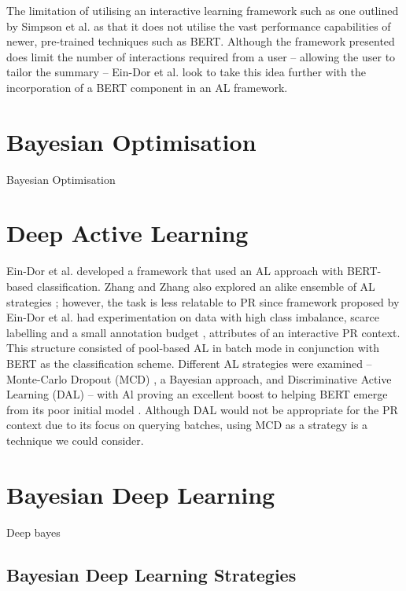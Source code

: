\documentclass[ %
                    author={James Stephenson},
                supervisor={Dr. Edwin Simpson},
                    degree={MSc},
                     title={Project Plan: Bayesian Deep Learning For Extractive Test Summarisation},
                  subtitle={},
                      type={},
                      year={2022}]{../additions/dissertation}
\begin{document}
The limitation of utilising an interactive learning framework such as one outlined by Simpson et al. \cite{Simpson19} as that it does not utilise the vast performance capabilities of newer, pre-trained techniques such as BERT. Although the framework presented does limit the number of interactions required from a user – allowing the user to tailor the summary – Ein-Dor et al. \cite{EinDor20} look to take this idea further with the incorporation of a BERT component in an AL framework. 

		\section{Bayesian Optimisation}
		\label{chap:literaturereview:bo}
		
		Bayesian Optimisation

		
		\section{Deep Active Learning}
		\label{chap:literaturereview:deepactive}
		
		Ein-Dor et al. \cite{EinDor20} developed a framework that used an AL approach with BERT-based classification. Zhang and Zhang also explored an alike ensemble of AL strategies \cite{Zhang19}; however, the task is less relatable to PR since framework proposed by Ein-Dor et al. had experimentation on data with high class imbalance, scarce labelling and a small annotation budget \cite{EinDor20}, attributes of an interactive PR context.  This structure consisted of pool-based AL \cite{Settles09} in batch mode in conjunction with BERT as the classification scheme. Different AL strategies were examined – Monte-Carlo Dropout (MCD) \cite{Gal15}, a Bayesian approach, and Discriminative Active Learning (DAL) \cite{Gissin19} – with Al proving an excellent boost to helping BERT emerge from its poor initial model \cite{EinDor19}. Although DAL would not be appropriate for the PR context due to its focus on querying batches, using MCD as a strategy is a technique we could consider.
		
		\section{Bayesian Deep Learning}
		\label{chap:literaturereview:deepbayes}
		
		Deep bayes
		
			\subsection{Bayesian Deep Learning Strategies}
			\label{chap:literaturereview:deepbayes:strategies}
			
\end{document}
